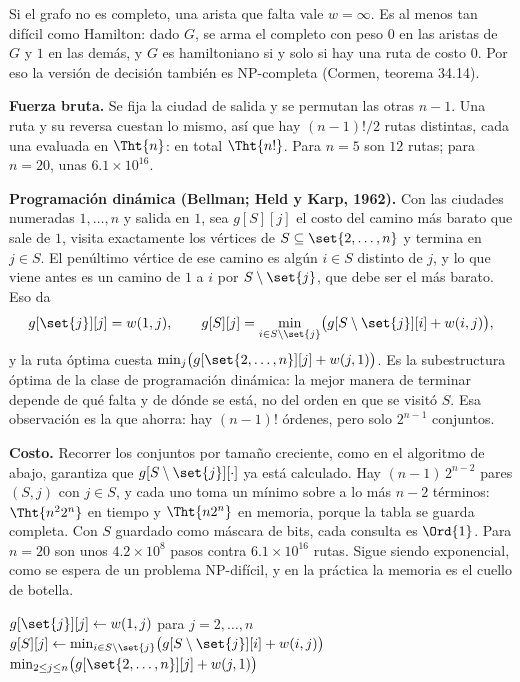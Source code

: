 \documentclass[11pt,letterpaper]{article}
\begin{document}
Si el grafo no es completo, una arista que falta vale $w = \infty$.
Es al menos tan difícil como Hamilton: dado $G$, se arma el completo
con peso $0$ en las aristas de $G$ y $1$ en las demás, y $G$ es
hamiltoniano si y solo si hay una ruta de costo $0$. Por eso la
versión de decisión también es NP-completa (Cormen, teorema 34.14).

\textbf{Fuerza bruta.} Se fija la ciudad de salida y se permutan las
otras $n - 1$. Una ruta y su reversa cuestan lo mismo, así que hay
$(n-1)!/2$ rutas distintas, cada una evaluada en $\Tht{n}$: en total
$\Tht{n!}$. Para $n = 5$ son $12$ rutas; para $n = 20$, unas
$6.1 \times 10^{16}$.

\textbf{Programación dinámica (Bellman; Held y Karp, 1962).} Con las
ciudades numeradas $1, \dots, n$ y salida en $1$, sea $g[S][j]$ el
costo del camino más barato que sale de $1$, visita exactamente los
vértices de $S \subseteq \set{2, \dots, n}$ y termina en $j \in S$.
El penúltimo vértice de ese camino es algún $i \in S$ distinto de
$j$, y lo que viene antes es un camino de $1$ a $i$ por
$S \setminus \set{j}$, que debe ser el más barato. Eso da
\[
  g[\set{j}][j] = w(1, j) , \qquad
  g[S][j] = \min_{i \in S \setminus \set{j}}
            \bigl( g[S \setminus \set{j}][i] + w(i, j) \bigr) ,
\]
y la ruta óptima cuesta
$\min_{j} \bigl( g[\set{2, \dots, n}][j] + w(j, 1) \bigr)$. Es la
subestructura óptima de la clase de programación dinámica: la mejor
manera de terminar depende de qué falta y de dónde se está, no del
orden en que se visitó $S$. Esa observación es la que ahorra: hay
$(n-1)!$ órdenes, pero solo $2^{n-1}$ conjuntos.

\textbf{Costo.} Recorrer los conjuntos por tamaño creciente, como en
el algoritmo de abajo, garantiza que $g[S \setminus \set{j}][\cdot]$
ya está calculado. Hay $(n-1)\, 2^{n-2}$ pares $(S, j)$ con
$j \in S$, y cada uno toma un mínimo sobre a lo más $n - 2$
términos: $\Tht{n^2 2^n}$ en tiempo y $\Tht{n 2^n}$ en memoria,
porque la tabla se guarda completa. Con $S$ guardado como máscara de
bits, cada consulta es $\Ord{1}$. Para
$n = 20$ son unos $4.2 \times 10^8$ pasos contra $6.1 \times 10^{16}$
rutas. Sigue siendo exponencial, como se espera de un problema
NP-difícil, y en la práctica la memoria es el cuello de botella.

\begin{algorithm}[H]
\caption{\textsc{Agente-Viajero}$(w, n)$: programación dinámica de
         Held y Karp}
\label{alg:hamilton-held-karp}
\begin{algorithmic}[1]
  \State $g[\set{j}][j] \gets w(1, j)$ para $j = 2, \dots, n$
   
        \State $g[S][j] \gets \min_{i \in S \setminus \set{j}}
               \bigl( g[S \setminus \set{j}][i] + w(i, j) \bigr)$
      \EndFor
    \EndFor
  \EndFor
  \State \Return $\min_{2 \le j \le n}
         \bigl( g[\set{2, \dots, n}][j] + w(j, 1) \bigr)$
\EndProcedure
\end{algorithmic}
\end{algorithm}
\end{document}
